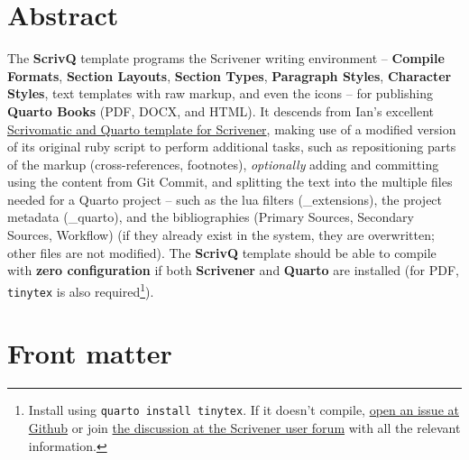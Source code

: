 \documentclass[
  12pt,
  a4paper,
  oneside,
  numbers=noenddot,
  titlepage,
  toclink=all,
  toc=bibliography]{scrbook}
\author{}
\date{}
\renewcommand*\contentsname{Table of contents}
\newcommand\contentsname{Table of contents}
\theoremstyle{definition}
\theoremstyle{definition}
\theoremstyle{definition}
\theoremstyle{plain}
\theoremstyle{plain}
\theoremstyle{plain}
\theoremstyle{plain}
\theoremstyle{plain}
\theoremstyle{remark}
\begin{document}
\frontmatter
\renewcommand*\contentsname{Table of contents}
{
\hypersetup{linkcolor=black}
\setcounter{tocdepth}{2}
\tableofcontents
}
\listoffigures
\listoftables
{}
\mainmatter
\hypertarget{sec-scriv1}{%
\chapter{Abstract}\label{sec-scriv1}}

The \textbf{ScrivQ} template programs the Scrivener writing environment
-- \textbf{Compile Formats}, \textbf{Section Layouts}, \textbf{Section
Types}, \textbf{Paragraph Styles}, \textbf{Character Styles}, text
templates with raw markup, and even the icons -- for publishing
\textbf{Quarto Books} (PDF, DOCX, and HTML). It descends from Ian's
excellent \href{https://github.com/iandol/scrivomatic}{Scrivomatic and
Quarto template for Scrivener}, making use of a modified version of its
original ruby script to perform additional tasks, such as repositioning
parts of the markup (cross-references, footnotes), \emph{optionally}
adding and committing using the content from Git Commit, and splitting
the text into the multiple files needed for a Quarto project -- such as
the lua filters (\_extensions), the project metadata (\_quarto), and the
bibliographies (Primary Sources, Secondary Sources, Workflow) (if they
already exist in the system, they are overwritten; other files are not
modified). The \textbf{ScrivQ} template should be able to compile with
\textbf{zero configuration} if both \textbf{Scrivener} and
\textbf{Quarto} are installed (for PDF, \texttt{tinytex} is also
required\footnote{Install using \texttt{quarto\ install\ tinytex}. If it
  doesn't compile,
  \href{https://github.com/bcdavasconcelos/scrivq/issues/new/choose}{open
  an issue at Github} or join
  \href{https://forum.literatureandlatte.com/t/134755}{the discussion at
  the Scrivener user forum} with all the relevant information.}).

\hypertarget{sec-scriv2}{%
\chapter{Front matter}\label{sec-scriv2}}

\end{document}
